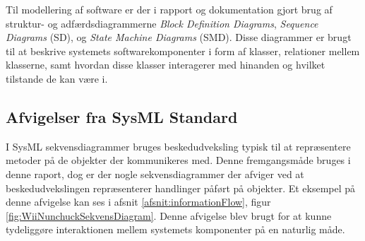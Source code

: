 \noindent Til modellering af software er der i rapport og dokumentation gjort brug af struktur- og adfærdsdiagrammerne \textit{Block Definition Diagrams}, \textit{Sequence Diagrams} (SD), og \textit{State Machine Diagrams} (SMD). Disse diagrammer er brugt til at beskrive systemets softwarekomponenter i form af klasser, relationer mellem klasserne, samt hvordan disse klasser interagerer med hinanden og hvilket tilstande de kan være i. 

\subsection{Afvigelser fra SysML Standard}
I SysML sekvensdiagrammer bruges beskedudveksling typisk til at repræsentere metoder på de objekter der kommunikeres med. Denne fremgangsmåde bruges i denne raport, dog er der nogle sekvensdiagrammer der afviger ved at beskedudvekslingen repræsenterer handlinger påført på objekter. Et eksempel på denne afvigelse kan ses i afsnit \ref{afsnit:informationFlow}, figur \ref{fig:WiiNunchuckSekvensDiagram}. Denne afvigelse blev brugt for at kunne tydeliggøre interaktionen mellem systemets komponenter på en naturlig måde.